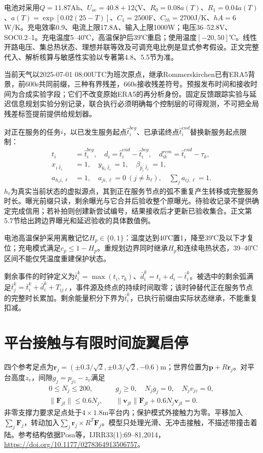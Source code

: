 \noindent 电池对采用$Q=11.87$Ah、$U_{oc}=40.8+12\zeta$V、$R_0=0.08a(T)$、$R_1=0.04a(T)$、$a(T)=\exp[0.02(25-T)]$、$C_1=2500$F、$C_{th}=2700$J/K、$hA=6$W/K。充电效率0.9、电流上限17.8A、输入上限1000W；电压36--52.8V、SOC0.2--1。充电温度5--40℃，高温保护后39℃重启；使用温度$[-20,50]$℃。线性开路电压、集总热状态、理想并联等效及可调充电比例是显式参考假设。正文完整代入、解析核算与敏感性实验以专著第4.8、5.5节为准。

\noindent 当前天气以2025-07-01 08:00UTC为班次原点，继承Rommerskirchen已有ERA5背景，前600s共同前缀，三种有界残差，660s接收残差符号。预报发布时间和接收时间为合成实验字段；它们不改变原始ERA5的再分析身份。固定反馈跟踪实验与延迟信息规划实验分别记录，联合执行必须明确每个控制层的可得观测，不可把全局残差标签提前提供给规划器。

\noindent 对正在服务的任务$i$，以已发生服务起点$\widehat t_i^{beg}$、已承诺终点$\widehat t_i^{end}$替换新服务起点限制：
\begin{align}
 t_i&=\widehat t_i^{beg},\quad d_i=\widehat t_i^{end}-\widehat t_i^{beg},\quad
 d_{ik}^{rem}=\widehat t_i^{end}-\tau_k,\\
 x_{i\widehat\ell_i}&=1,\quad y_{\widehat u_i\widehat\ell_i}=1,\quad\beta_{\widehat p_i\widehat\ell_i}=1,\\
 a_{h_\ell i,\ell}&=1,\quad a_{ji,\ell}=0\ (j\ne h_\ell),\quad\sum_j a_{ij,\ell}=1.
 \label{eng:eq:servicecarryover}
\end{align}
\noindent $h_\ell$为真实当前状态的虚拟源点，其到正在服务节点的弧不重复产生转移或完整服务时长。曝光前缀只读，剩余曝光与它合并后验收整个原曝光。待验收记录不提供确定完成信用；若补拍则创建新尝试编号，结果接收后才更新已验收集合。正文第5.7节给出跨边界曝光和延迟验收的具体数值例。

\noindent 电池高温保护采用离散记忆$H_p\in\{0,1\}$：温度达到40℃置1，降至39℃及以下才复位；充电模式满足$c_p\le1-H_p$。重规划边界同时继承$H_p$和连续电热状态，39--40℃区间不能仅凭温度重建保护状态。

\noindent 剩余事件的时钟定义为$\bar t_i^k=\max(t_i,\tau_k)$、$\bar d_i^k=t_i+d_i-\bar t_i^k$。被选中的剩余弧满足$\bar t_j^k=\bar t_i^k+\bar d_i^k+T_{ij\ell}$，事件源及终点的持续时间取零；该时钟替代正在服务节点的完整时长累加。剩余能量积分下界为$\bar t_i^k$，已执行前缀由实际状态继承，不能重复扣减。

\section{平台接触与有限时间旋翼启停}
四个参考足点为$\mathbf r_j=(\pm0.3/\sqrt2,\pm0.3/\sqrt2,-0.6)$m；世界位置为$\mathbf p+R\mathbf r_j$。对平台高度$z_v$，间隙$g_j=p_{jz}-z_v$满足
\begin{align}
0\le N_j\le200,&\quad g_j\ge0,\quad N_jg_j=0,\quad N_jv_{jz}=0,\\
\|\mathbf F_{jt}\|\le0.6N_j,&\quad
\|\mathbf v_{jt}\|\mathbf F_{jt}+0.6N_j\mathbf v_{jt}=0.
\end{align}
非零支撑力要求足点处于$4\times1.8$m平台内；保护模式外接触力为零。平移加入$\sum_j\mathbf F_j$，转动加入$\sum_j\mathbf r_j\times R^T\mathbf F_j$。模型只处理光滑、无冲击接触，不描述带撞击着陆。参考结构依据Posa等，IJRR33(1):69--81,2014，\url{https://doi.org/10.1177/0278364913506757}。

